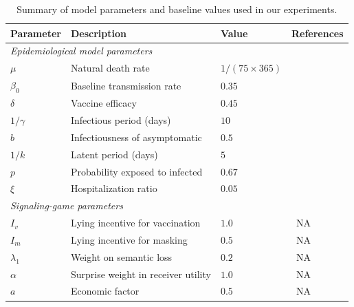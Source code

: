 \documentclass[sigconf,review]{acmart}
\begin{document}
\begin{table}[t]
\begin{minipage}{\textwidth}
\centering
\caption{Summary of model parameters and baseline values used in our experiments.}
\label{tab:param-summary}
\begin{tabular}{l|l|l|l}
\toprule
\textbf{Parameter} & \textbf{Description} & \textbf{Value} & \textbf{References} \\
\midrule
\multicolumn{4}{l}{\textit{Epidemiological model parameters}} \\
\midrule
$\mu$         & Natural death rate                         & $1/(75 \times 365)$ & ~\cite{Longini2004}\\
$\beta_0$     & Baseline transmission rate                 & $0.35$ & ~\cite{JING2021}\\
$\delta$      & Vaccine efficacy                                      & $0.45$ & ~\cite{Dawood2020}\\
$1/\gamma$    & Infectious period (days)                              & $10$ & ~\cite{Walsh2020}\\
$b$           & Infectiousness of asymptomatic                        & $0.5$ & ~\cite{Longini2004}\\
$1/k$         & Latent period (days)                                  & $5$ & ~\cite{RELUGA2011}\\
$p$           & Probability exposed to infected                       & $0.67$ &~\cite{Longini2004}\\
$\xi$         & Hospitalization ratio                                 & $0.05$ & ~\cite{FoxPNAS2022} \\
\midrule
\multicolumn{4}{l}{\textit{Signaling-game parameters}} \\
\midrule
$I_v$         & Lying incentive for vaccination                       & $1.0$ & ~NA\\
$I_m$         & Lying incentive for masking                           & $0.5$ & ~NA\\
$\lambda_1$   & Weight on semantic loss                               & $0.2$ & ~NA\\
$\alpha$      & Surprise weight in receiver utility                   & $1.0$ & ~NA\\
$a$           & Economic factor                                       & $0.5$ & ~NA\\

\end{tabular}
\end{minipage}
\end{table}
\end{document}
